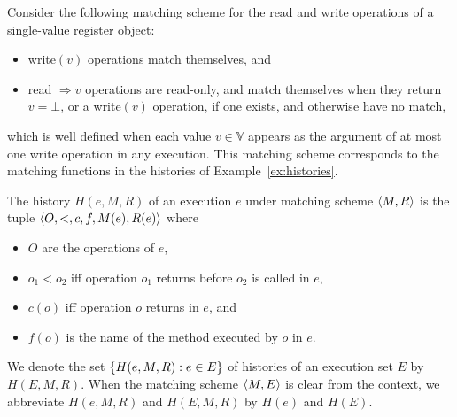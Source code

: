 \begin{example}
  \label{ex:matching}

  Consider the following matching scheme for the read and write operations of
  a single-value register object:
  \begin{itemize}

    \item write$(v)$ operations match themselves, and

    \item read $\Rightarrow v$ operations are read-only, and match themselves
    when they return $v = \mathord\perp$, or a write$(v)$ operation, if one
    exists, and otherwise have no match,
    
  \end{itemize}
  which is well defined when each value $v \in \mathbb{V}$ appears as the
  argument of at most one write operation in any execution. This matching
  scheme corresponds to the matching functions in the histories of
  Example~\ref{ex:histories}.

\end{example}

The history $H(e,M,R)$ of an execution $e$ under matching scheme ${\left\langle{M,R}\right\rangle}$ is
the tuple ${\left\langle{O,<,c,f,M(e),R(e)}\right\rangle}$ where
\begin{itemize}

  \item $O$ are the operations of $e$,

  \item $o_1 < o_2$ if{f} operation $o_1$ returns before $o_2$ is called in $e$,

  \item $c(o)$ if{f} operation $o$ returns in $e$, and

  \item $f(o)$ is the name of the method executed by $o$ in $e$.

\end{itemize}
We denote the set ${\{{H(e,M,R) : e \in E}\}}$ of histories of an execution set
$E$ by $H(E,M,R)$. When the matching scheme ${\left\langle{M,E}\right\rangle}$ is clear from the
context, we abbreviate $H(e,M,R)$ and $H(E,M,R)$ by $H(e)$ and $H(E)$.

